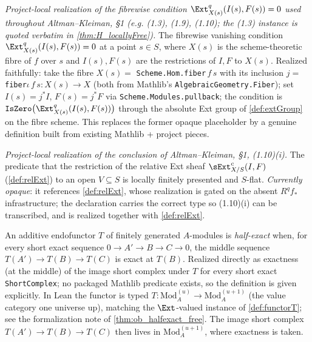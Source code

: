 \begin{definition}[Fibrewise Ext-vanishing $\Ext^q_{X(s)}(I(s),F(s)) = 0$]\leanok
  \label{def:fiberExtVanishes}
  \textit{Project-local realization of the fibrewise condition $\Ext^q_{X(s)}(I(s),F(s))=0$ used throughout Altman--Kleiman, §1 (e.g. (1.3), (1.9), (1.10); the (1.3) instance is quoted verbatim in \cref{thm:H_locallyFree}).}
  The fibrewise vanishing condition $\Ext^q_{X(s)}(I(s),F(s)) = 0$ at a point
  $s \in S$, where $X(s)$ is the scheme-theoretic fibre of $f$ over $s$ and
  $I(s), F(s)$ are the restrictions of $I, F$ to $X(s)$. Realized faithfully: take
  the fibre $X(s) = $ \texttt{Scheme.Hom.fiber}\,$f\,s$ with its inclusion
  $j = $ \texttt{fiber\(\iota\)}\,$f\,s : X(s) \to X$ (both from Mathlib's
  \texttt{AlgebraicGeometry.Fiber}); set $I(s) = j^* I$, $F(s) = j^* F$ via
  \texttt{Scheme.Modules.pullback}; the condition is
  $\mathtt{IsZero}\big(\Ext^q_{X(s)}(I(s), F(s))\big)$ through the absolute Ext
  group of \cref{def:extGroup} on the fibre scheme. This replaces the former opaque
  placeholder by a genuine definition built from existing Mathlib + project pieces.
\end{definition}

\begin{definition}
  \label{def:isLFPAndFlatOn}
  \textit{Project-local realization of the conclusion of Altman--Kleiman, §1, (1.10)(i).}
  The predicate that the restriction of the relative Ext sheaf
  $\sExt^c_{X/S}(I,F)$ (\cref{def:relExt}) to an open $V \subseteq S$ is locally
  finitely presented and $S$-flat. \emph{Currently opaque}: it references
  \cref{def:relExt}, whose realization is gated on the absent $R^q f_*$
  infrastructure; the declaration carries the correct type so (1.10)(i) can be
  transcribed, and is realized together with \cref{def:relExt}.
\end{definition}

\begin{definition}
  \label{def:isHalfExact}
  An additive endofunctor $T$ of finitely generated $A$-modules is
  \emph{half-exact} when, for every short exact sequence
  $0 \to A' \to B \to C \to 0$, the middle sequence $T(A') \to T(B) \to T(C)$ is
  exact at $T(B)$. Realized directly as exactness (at the middle) of the image
  short complex under $T$ for every short exact \texttt{ShortComplex}; no packaged
  Mathlib predicate exists, so the definition is given explicitly.
  In Lean the functor is typed $T : \mathrm{Mod}_A^{(u)} \to \mathrm{Mod}_A^{(u+1)}$
  (the value category one universe up), matching the $\Ext$-valued instance of
  \cref{def:functorT}; see the formalization note of \cref{thm:ob_halfexact_free}.
  The image short complex $T(A')\to T(B)\to T(C)$ then lives in
  $\mathrm{Mod}_A^{(u+1)}$, where exactness is taken.
\end{definition}

